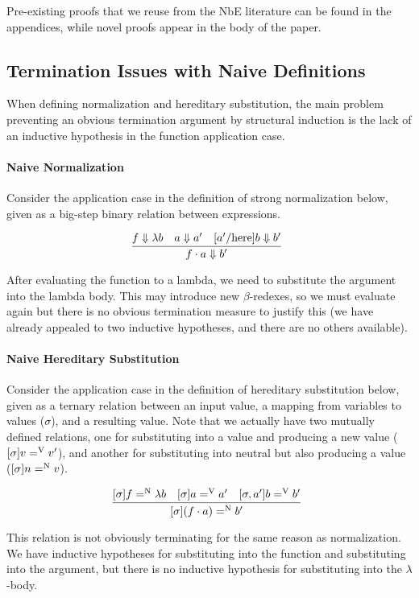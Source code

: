 \documentclass{llncs}
\def\bigstep{\Downarrow}
\def\app{\cdot}
\def\lam{\lambda}
\newcommand{\hsubn}[2]{[\sigma]#1=^\con{N}#2}
\newcommand{\hsub}[2]{[\sigma]#1=^\con{V}#2}
\newcommand{\hsubext}[3]{[\sigma, #1]#2=^\con{V}#3}
\newcommand{\con}[1]{\textmd{#1}}
\begin{document}
Pre-existing proofs that we reuse from the NbE literature can be found
in the appendices, while novel proofs appear in the body of the paper.

\subsection{Termination Issues with Naive Definitions}

When defining normalization and hereditary substitution, the
main problem preventing an obvious termination
argument by structural induction is the lack of
an inductive hypothesis in the function application case.

\paragraph{Naive Normalization}
Consider the application case in the definition of strong normalization
below, given as a big-step binary relation between expressions.

$$
\infer
  []{f \app a \bigstep {b'}}
{
  f \bigstep \lam b
  &
  a \bigstep a'
  &
  [a'/\con{here}]b \bigstep b'
}
$$

After evaluating the function to a lambda, we need to
substitute the argument into the lambda body. This may introduce
new $\beta$-redexes, so we must evaluate again but
there is no obvious termination measure to justify this (we have
already appealed to two inductive hypotheses, and there are no others
available).

\paragraph{Naive Hereditary Substitution}
Consider the application case in the definition of hereditary substitution
below, given as a ternary relation between an input value, a mapping from
variables to values ($\sigma$), and a resulting value. Note that we
actually have two mutually defined relations, one for substituting
into a value and producing a new value ($\hsub{v}{v'}$), and another
for substituting into neutral but also producing a value
($\hsubn{n}{v}$).

$$
\infer
   []{\hsubn{(f \app a)}{b'}}
{
  \hsubn{f}{\lam b}
  &
  \hsub{a}{a'}
  &
  \hsubext{a'}{b}{b'}
}
$$

This relation is not obviously terminating for the same reason as
normalization. We have inductive hypotheses for substituting into the
function and substituting into the argument, but there is no inductive hypothesis for
substituting into the $\lambda$-body.
\end{document}

